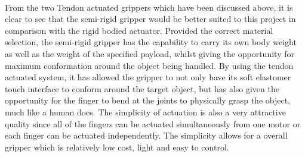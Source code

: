 \documentclass[11pt,twocolumn]{article}
\begin{document}
\\
From the two Tendon actuated grippers which have been discussed above, it is clear to see that the semi-rigid gripper would be better suited to this project in comparison with the rigid bodied actuator. Provided the correct material selection, the semi-rigid gripper has the capability to carry its own body weight as well as the weight of the specified payload, whilst giving the opportunity for maximum conformation around the object being handled. By using the tendon actuated system, it has allowed the gripper to not only have its soft elastomer touch interface to conform around the target object, but has also given the opportunity for the finger to bend at the joints to physically grasp the object, much like a human does. The simplicity of actuation is also a very attractive quality since all of the fingers can be actuated simultaneously from one motor or each finger can be actuated independently. The simplicity allows for a overall gripper which is relatively low cost, light and easy to control.
\end{document}
